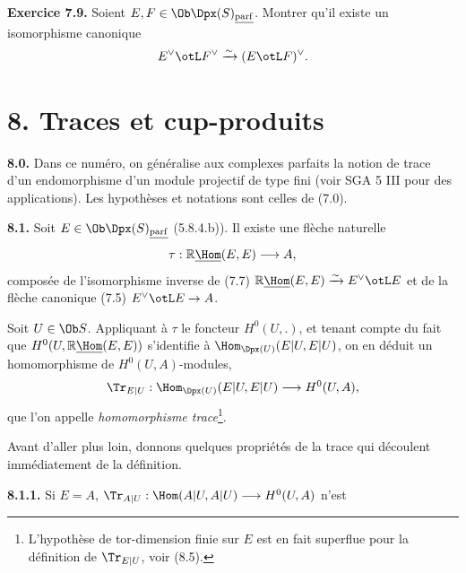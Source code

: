 \textbf{Exercice 7.9.} Soient \(E,F\in\Ob\Dpx(S)_{\underline{\mathrm{parf}}}\). Montrer qu'il existe un isomorphisme canonique
\[
  E^\vee\otL F^\vee \xrightarrow{\sim} (E\otL F)^\vee .
\]

\section*{8. Traces et cup-produits}

\textbf{8.0.} Dans ce numéro, on généralise aux complexes parfaits la notion de trace d'un endomorphisme d'un module projectif de type fini (voir SGA 5 III pour des applications). Les hypothèses et notations sont celles de (7.0).

\textbf{8.1.} Soit \(E\in\Ob\Dpx(S)_{\underline{\mathrm{parf}}}\) (5.8.4.b)). Il existe une flèche naturelle
\[
  \tau:\mathbb{R}\underline{\Hom}(E,E)\longrightarrow A,
\]
composée de l'isomorphisme inverse de (7.7) \(\mathbb{R}\underline{\Hom}(E,E)\xrightarrow{\sim}E^\vee\otL E\) et de la flèche canonique (7.5) \(E^\vee\otL E\to A\).

Soit \(U\in\Ob S\). Appliquant à \(\tau\) le foncteur \(H^0(U,.)\), et tenant compte du fait que \(H^0(U,\mathbb{R}\underline{\Hom}(E,E))\) s'identifie à \(\Hom_{\Dpx(U)}(E|U,E|U)\), on en déduit un homomorphisme de \(H^0(U,A)\)-modules,
\[
  \Tr_{E|U}:\Hom_{\Dpx(U)}(E|U,E|U)\longrightarrow H^0(U,A),
\]
que l'on appelle \emph{homomorphisme trace}\footnote{L'hypothèse de tor-dimension finie sur \(E\) est en fait superflue pour la définition de \(\Tr_{E|U}\), voir (8.5).}.

Avant d'aller plus loin, donnons quelques propriétés de la trace qui découlent immédiatement de la définition.

\textbf{8.1.1.} Si \(E=A\), \(\Tr_{A|U}:\Hom(A|U,A|U)\longrightarrow H^0(U,A)\) n'est
